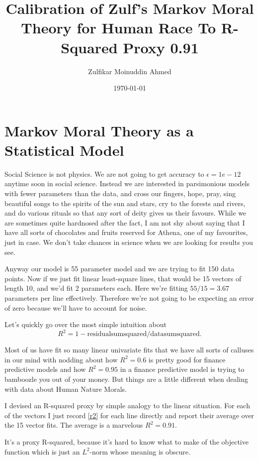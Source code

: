 \documentclass{amsart}
\title{Calibration of Zulf's Markov Moral Theory for Human Race To R-Squared Proxy 0.91}
\author{Zulfikar Moinuddin Ahmed}
\date{\today}
\begin{document}
\maketitle

\section{Markov Moral Theory as a Statistical Model}

Social Science is not physics.  We are not going to get accuracy to $\epsilon=1e-12$ anytime soon in social science.  Instead we are interested in parsimonious models with fewer parameters than the data, and cross our fingers, hope, pray, sing beautiful songs to the spirits of the sun and stars, cry to the forests and rivers, and do various rituals so that any sort of deity gives us their favours.  While we are sometimes quite hardnosed after the fact, I am not shy about saying that I have all sorts of chocolates and fruits reserved for Athena, one of my favourites, just in case.  We don't take chances in science when we are looking for results you see.  

Anyway our model is 55 parameter model and we are trying to fit 150 data points.  Now if we just fit linear least-square lines, that would be 15 vectors of length 10, and we'd fit 2 parameters each.  Here we're fitting $55/15=3.67$ parameters per line effectively.  Therefore we're not going to be expecting an error of zero because we'll have to account for noise.

Let's quickly go over the most simple intuition about 
\begin{equation}
\label{r2}
R^2 = 1 - \mathrm{residual sum squared}/\mathrm{data sum squared}.
\end{equation}  

Most of us have fit so many linear univariate fits that we have all sorts of calluses in our mind with nodding about how $R^2=0.6$ is pretty good for finance predictive models and how $R^2=0.95$ in a finance predictive model is trying to bamboozle you out of your money.  But things are a little different when dealing with data about Human Nature Morals.  

I devised an R-squared proxy by simple analogy to the linear situation.  For each of the vectors I just record \eqref{r2} for each line directly and report their average over the 15 vector fits.  The average is a marvelous $R^2=0.91$.

It's a proxy R-squared, because it's hard to know what to make of the objective function which is just an $L^2$-norm whose meaning is obscure.
\end{document}
